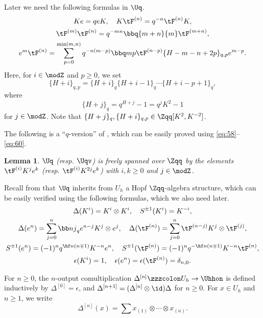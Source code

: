 \documentclass{amsart}
\numberwithin{equation}{section}
\numberwithin{figure}{section}
\theoremstyle{plain}
\newtheorem{lemma}[theorem]{Lemma}
\theoremstyle{definition}
\theoremstyle{remark}
\begin{document}
Later we need the following formulas in $\Uq$.
\begin{gather}
  \label{eq:58}
  Ke=qeK,\quad
  K\tF^{(n)}=q^{-n}\tF^{(n)}K,\\
  \label{eq:59}
  \tF^{(m)}\tF^{(n)}=q^{-mn}\bbq{m+n}{m} \tF^{(m+n)},\\
  \label{eq:60}
  e^m\tF^{(n)}= \sum_{p=0}^{\min(m,n)}
    q^{-n(m-p)}{\bbq mp} \tF^{(n-p)}\{H-m-n+2p\}_{q,p} {e^{m-p}}.
\end{gather}
Here, for $i\in \modZ $ and $p\ge 0$, we set
\begin{equation*}
  \{H+i\}_{q,p} = \{H+i\}_q\{H+i-1\}_q\cdots\{H+i-p+1\}_q,
\end{equation*}
where
\begin{equation*}
  \{H+j\}_q = q^{H+j}-1 = q^jK^2-1
\end{equation*}
for $j\in \modZ $.  Note that $\{H+j\}_q,\{H+i\}_{q,p}\in \Zqq[K^2,K^{-2}]$.

The following is a ``$q$-version'' of \cite[Proposition 3.1]{H:uqsl2},
which can be easily proved using \eqref{eq:58}--\eqref{eq:60}.

\begin{lemma}
  \label{r39}
  $\Uq$ (resp. $\Uqv$) is freely spanned over $\Zqq$ by the elements
  $\tF^{(i)}K^je^k$ (resp. $\tF^{(i)}K^{2j}e^k$) with $i,k\ge 0$ and
  $j\in \modZ $.
\end{lemma}

Recall from \cite{H:uqsl2} that $\Uq$ inherits from $U_h$ a Hopf
 $\Zqq$-algebra structure, which can be easily verified using the
 following formulas, which we also need later.
\begin{gather}
  \label{eq:53}
  \Delta (K^i) = K^i\otimes K^i,\quad   S^{\pm 1}(K^i) = K^{-i},\\
  \label{eq:54}
  \Delta (e^n) = \sum_{j=0}^n {\bb nj}_q e^{n-j}K^j\otimes e^j,\quad
  \Delta (\tF^{(n)})=\sum_{j=0}^n \tF^{(n-j)}K^j\otimes \tF^{(j)},\\
  \label{eq:55}
  S^{\pm 1}(e^n)=(-1)^n q^{\hf n(n\mp1)} K^{-n} e^n,\quad
  S^{\pm 1}(\tF^{(n)}) =(-1)^n q^{-\hf n(n\mp1)} K^{-n}\tF^{(n)},\\
  \label{eq:4}
  \epsilon (K^i)=1,\quad \epsilon (e^n)=\epsilon (\tF^{(n)}) = \delta _{n,0}.
\end{gather}

For $n\ge 0$, the $n$-output comultiplication $\Delta ^{[n]}\zzzcolon U_h\rightarrow \Uhhon$ is
defined inductively by $\Delta ^{[0]}=\epsilon $, and $\Delta ^{[n+1]}=(\Delta ^{[n]}\otimes \id)\Delta $
for $n\ge 0$.  For $x\in U_h$ and $n\ge 1$, we write
\begin{equation*}
  \Delta ^{[n]}(x)=\sum x_{(1)}\otimes \cdots\otimes x_{(n)}.
\end{equation*}
\end{document}
